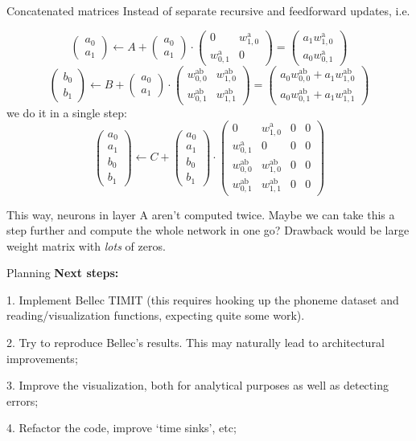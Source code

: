 \documentclass[t]{beamer}
\newcommand*\vc[1]%
{\left(\begin{array}{cccc}#1\end{array}\right)}
\begin{document}
\begin{frame}{Concatenated matrices}
Instead of separate recursive and feedforward updates, i.e.

\begin{equation*}
    \vc{a_0\\a_1} \gets A + \vc{a_0\\a_1} \cdot \vc{0 & w_{1,0}^\text{a}\\w_{0,1}^\text{a} & 0} = \vc{a_1w^\text{a}_{1,0}\\a_0w^\text{a}_{0,1}}
\end{equation*}
\begin{equation*}
    \vc{b_0\\b_1} \gets B + \vc{a_0\\a_1} \cdot \vc{w_{0,0}^\text{ab} & w_{1,0}^\text{ab}\\w_{0,1}^\text{ab} & w_{1,1}^\text{ab}} = \vc{a_0w_{0,0}^\text{ab} + a_1w_{1,0}^\text{ab}\\a_0w_{0,1}^\text{ab} + a_1w_{1,1}^\text{ab}}
\end{equation*}
we do it in a single step:
\begin{equation*}
    \left(\begin{array}{c}a_0\\a_1\\\hline b_0\\b_1\end{array}\right) \gets C + 
    \left(\begin{array}{c}a_0\\a_1\\\hline b_0\\b_1\end{array}\right)
    \cdot \left(\begin{array}{cc|cc}0 & w_{1,0}^\text{a} &0 &0\\w_{0,1}^\text{a} & 0 &0 &0\\\hline w_{0,0}^\text{ab} & w_{1,0}^\text{ab} & 0 &0\\w_{0,1}^\text{ab} & w_{1,1}^\text{ab } & 0 & 0\end{array}\right)
\end{equation*}

This way, neurons in layer A aren't computed twice. Maybe we can take this a step further and compute the whole network in one go? Drawback would be large weight matrix with \emph{lots} of zeros.

\end{frame}

\begin{frame}{Planning}
    \textbf{Next steps:}
    
    1. Implement Bellec TIMIT (this requires hooking up the phoneme dataset and reading/visualization functions, expecting quite some work).
    
    2. Try to reproduce Bellec's results. This may naturally lead to architectural improvements;
    
    3. Improve the visualization, both for analytical purposes as well as detecting errors;
    
    4. Refactor the code, improve `time sinks', etc;
\end{frame}
\end{document}
